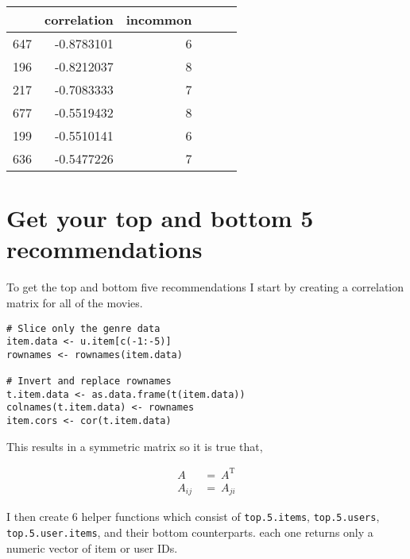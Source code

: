\documentclass[12pt, a4paper]{article}
\newcommand{\code}[1]{\texttt{#1}}
\begin{document}
\begin{minipage}{\linewidth} %
\vspace{2em}
\centering
\begin{tabular}{|l|r|r|l|l|l|}
        \hline
          & correlation & incommon\\
        \hline
        647 & -0.8783101 & 6\\
        \hline
        196 & -0.8212037 & 8\\
        \hline
        217 & -0.7083333 & 7\\
        \hline
        677 & -0.5519432 & 8\\
        \hline
        199 & -0.5510141 & 6\\
        \hline
        636 & -0.5477226 & 7\\
        \hline
\end{tabular}
\vspace{2em}
\end{minipage}


\newpage
\section{Get your top and bottom 5 recommendations}

To get the top and bottom five recommendations I start by creating a correlation matrix for all of the movies. 

\begin{minipage}{\linewidth} %
\vspace{2em}
\begin{verbatim}
# Slice only the genre data
item.data <- u.item[c(-1:-5)]
rownames <- rownames(item.data)

# Invert and replace rownames
t.item.data <- as.data.frame(t(item.data))
colnames(t.item.data) <- rownames
item.cors <- cor(t.item.data)
\end{verbatim}
\vspace{2em}
\end{minipage}

This results in a symmetric matrix so it is true that,

\begin{align*}
    A\:&=\:A^{\mathrm{T}}\\
    A_{ij}\:&=\:A_{ji}
\end{align*}

I then create $6$ helper functions which consist of \code{top.5.items}, \code{top.5.users}, \code{top.5.user.items}, and their bottom counterparts. each one returns only a numeric vector of item or user IDs.
\end{document}
